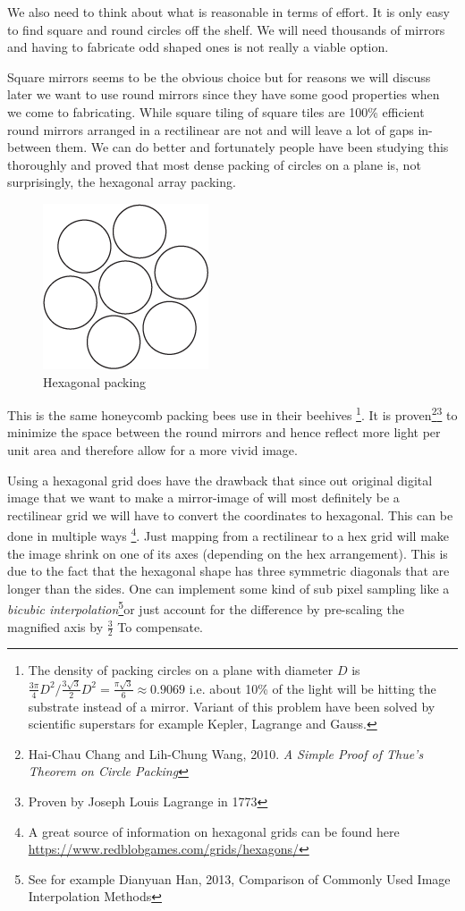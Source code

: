 \documentclass{article}
\begin{document}
We also need to think about what is reasonable in terms of effort. It is
only easy to find square and round circles off the shelf. We will need
thousands of mirrors and having to fabricate odd shaped ones is not
really a viable option.

Square mirrors seems to be the obvious choice but for reasons we will
discuss later we want to use round mirrors since they have some good
properties when we come to fabricating. While square tiling of square
tiles are 100\% efficient round mirrors arranged in a rectilinear are
not and will leave a lot of gaps in-between them. We can do better and
fortunately people have been studying this thoroughly and proved that
most dense packing of circles on a plane is, not surprisingly, the hexagonal array packing.

\begin{figure}[ht!]
\centering
\includegraphics{images/circular-pattern.png}
\caption{Hexagonal packing}
\end{figure}


This is the same honeycomb packing bees use in their beehives
\footnote{The density of packing circles on a plane with diameter \(D\)
  is
  \(\frac{3\pi}{4}D^2 \big/ \frac{3\sqrt{3}}{2}D^2= \frac{\pi\sqrt{3}}{6} \approx 0.9069\)
  i.e. about 10\% of the light will be hitting the substrate instead of
  a mirror. Variant of this problem have been solved by scientific
  superstars for example Kepler, Lagrange and Gauss.}. It is
proven\footnote{Hai-Chau Chang and Lih-Chung Wang, 2010. \emph{A Simple
  Proof of Thue's Theorem on Circle Packing}}\footnote{Proven by Joseph
  Louis Lagrange in 1773} to minimize the space between the round
mirrors and hence reflect more light per unit area and therefore allow
for a more vivid image.

Using a hexagonal grid does have the drawback that since out original
digital image that we want to make a mirror-image of will most definitely
be a rectilinear grid we will have to convert the coordinates to
hexagonal. This can be done in multiple ways \footnote{A great source of
  information on hexagonal grids can be found here
  \url{https://www.redblobgames.com/grids/hexagons/}}. Just mapping
from a rectilinear to a hex grid will make the image shrink on one of
its axes (depending on the hex arrangement). This is due to the fact that 
the hexagonal shape has three symmetric diagonals that are longer than the sides.
One can implement some kind of sub pixel sampling like a \emph{bicubic interpolation}\footnote{See
  for example Dianyuan Han, 2013, Comparison of Commonly Used Image
  Interpolation Methods}or just account for the difference by
pre-scaling the magnified axis by \(\frac{3}{2}\) To compensate.
\end{document}
